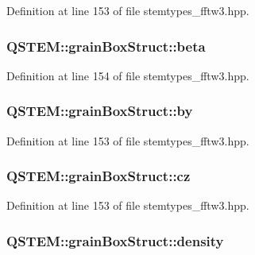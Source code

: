 Definition at line 153 of file stemtypes\-\_\-fftw3.\-hpp.

\hypertarget{struct_q_s_t_e_m_1_1grain_box_struct_a646d0a466bd5f41a60d3aa96f43f11dd}{
\subsubsection[{beta}]{ Q\-S\-T\-E\-M\-::grain\-Box\-Struct\-::beta}}\label{struct_q_s_t_e_m_1_1grain_box_struct_a646d0a466bd5f41a60d3aa96f43f11dd}


Definition at line 154 of file stemtypes\-\_\-fftw3.\-hpp.

\hypertarget{struct_q_s_t_e_m_1_1grain_box_struct_a0ab6cfbec9b1c56cb0fbc3114e7fc686}{
\subsubsection[{by}]{ Q\-S\-T\-E\-M\-::grain\-Box\-Struct\-::by}}\label{struct_q_s_t_e_m_1_1grain_box_struct_a0ab6cfbec9b1c56cb0fbc3114e7fc686}


Definition at line 153 of file stemtypes\-\_\-fftw3.\-hpp.

\hypertarget{struct_q_s_t_e_m_1_1grain_box_struct_aa743247daeeeab63eb5d9eeb29048ac9}{
\subsubsection[{cz}]{ Q\-S\-T\-E\-M\-::grain\-Box\-Struct\-::cz}}\label{struct_q_s_t_e_m_1_1grain_box_struct_aa743247daeeeab63eb5d9eeb29048ac9}


Definition at line 153 of file stemtypes\-\_\-fftw3.\-hpp.

\hypertarget{struct_q_s_t_e_m_1_1grain_box_struct_af5efd60c4a0097266ac1d82ebf3bc4eb}{
\subsubsection[{density}]{ Q\-S\-T\-E\-M\-::grain\-Box\-Struct\-::density}}\label{struct_q_s_t_e_m_1_1grain_box_struct_af5efd60c4a0097266ac1d82ebf3bc4eb}


